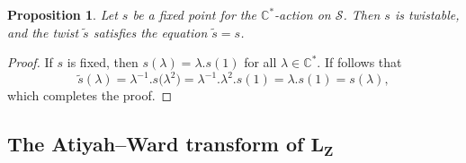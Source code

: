 \documentclass[pdftex]{sigma}
\numberwithin{equation}{section}
\newtheorem{Proposition}[Theorem]{Proposition}
\theoremstyle{definition}
\newcommand\C{{\mathbb C}}
\begin{document}
\begin{Proposition}\label{Prop: FixedPointTwist}
Let $s$ be a fixed point for the $\C^*$-action on $\mathcal S$. Then $s$ is twistable, and the twist $\widetilde{s}$ satisfies
the equation $\widetilde{s} = s$.
\end{Proposition}

\begin{proof}
If $s$ is fixed, then $s(\lambda) = \lambda.s(1)$ for all $\lambda \in \C^*$. If follows that
\[\widetilde s(\lambda) = \lambda^{-1}.s\bigl(\lambda^2\bigr) = \lambda^{-1}.\lambda^2.s(1) = \lambda.s(1) = s(\lambda),\]
which completes the proof.
\end{proof}

\subsection[The Atiyah--Ward transform of L\_Z]{The Atiyah--Ward transform of $\boldsymbol{L_Z}$}\label{ss:AW}
\end{document}

